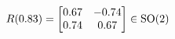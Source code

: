 \documentclass[preview]{standalone}
\begin{document}
\begin{align*}
\special{dvisvgm:raw <g id='unique000'>}R(0.83) = \begin{bmatrix} 0.67 & -0.74 \\ 0.74 & 0.67 \end{bmatrix} \in \text{SO}(2)\special{dvisvgm:raw </g>}
\end{align*}
\end{document}
